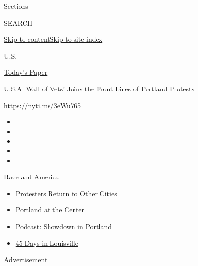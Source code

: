 Sections

SEARCH

\protect\hyperlink{site-content}{Skip to
content}\protect\hyperlink{site-index}{Skip to site index}

\href{https://www.nytimes.com/section/us}{U.S.}

\href{https://myaccount.nytimes.com/auth/login?response_type=cookie\&client_id=vi}{}

\href{https://www.nytimes.com/section/todayspaper}{Today's Paper}

\href{/section/us}{U.S.}\textbar{}A `Wall of Vets' Joins the Front Lines
of Portland Protests

\url{https://nyti.ms/3eWu765}

\begin{itemize}
\item
\item
\item
\item
\item
\end{itemize}

\href{https://www.nytimes.com/news-event/george-floyd-protests-minneapolis-new-york-los-angeles?action=click\&pgtype=Article\&state=default\&region=TOP_BANNER\&context=storylines_menu}{Race
and America}

\begin{itemize}
\tightlist
\item
  \href{https://www.nytimes.com/2020/07/26/us/protests-portland-seattle-trump.html?action=click\&pgtype=Article\&state=default\&region=TOP_BANNER\&context=storylines_menu}{Protesters
  Return to Other Cities}
\item
  \href{https://www.nytimes.com/2020/07/24/us/portland-oregon-protests-white-race.html?action=click\&pgtype=Article\&state=default\&region=TOP_BANNER\&context=storylines_menu}{Portland
  at the Center}
\item
  \href{https://www.nytimes.com/2020/07/23/podcasts/the-daily/portland-protests.html?action=click\&pgtype=Article\&state=default\&region=TOP_BANNER\&context=storylines_menu}{Podcast:
  Showdown in Portland}
\item
  \href{https://www.nytimes.com/interactive/2020/07/16/us/black-lives-matter-protests-louisville-breonna-taylor.html?action=click\&pgtype=Article\&state=default\&region=TOP_BANNER\&context=storylines_menu}{45
  Days in Louisville}
\end{itemize}

Advertisement

